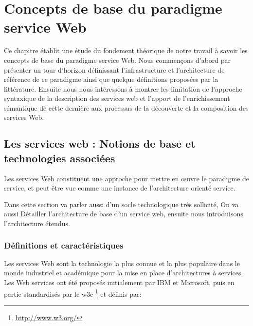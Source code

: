 

\chapter{Concepts de base du paradigme service Web} 

    Ce chapitre établit une étude du fondement théorique de notre travail à savoir les concepts de base du paradigme
    service Web.  Nous commençons d'abord par présenter un tour d'horizon définissant l'infrastructure et
    l'architecture de référence de ce paradigme ainsi que quelque définitions proposées par la littérature. Ensuite
    nous nous intéressons à montrer les limitation de l'approche syntaxique de la description des services web et l'apport
    de l'enrichissement sémantique de cette dernière aux processus de la découverte et la composition des services Web.\\
    \newpage

\section{Les services web : Notions de base et technologies associées} 
    Les services Web constituent une approche pour mettre en œuvre le paradigme de service, et peut être vue comme
    une instance de l'architecture orienté service.

    Dans cette section va parler aussi d'un socle technologique très sollicité, On va aussi Détailler l'architecture de base 
    d'un service web, ensuite nous introduisons l'architecture étendus.

    \subsection{Définitions et caractéristiques } 
	Les services Web sont la technologie la plus connue et la plus populaire dans le monde industriel et
	académique pour la mise en place d’architectures à services. 
	Les Web services ont été proposés initialement par IBM \cite{kreger2001web} et Microsoft, puis en partie 
	standardisés par le \acrshort{w3c} \footnote{\url{http://www.w3.org/}} et définis \cite{WSA} par:\\

